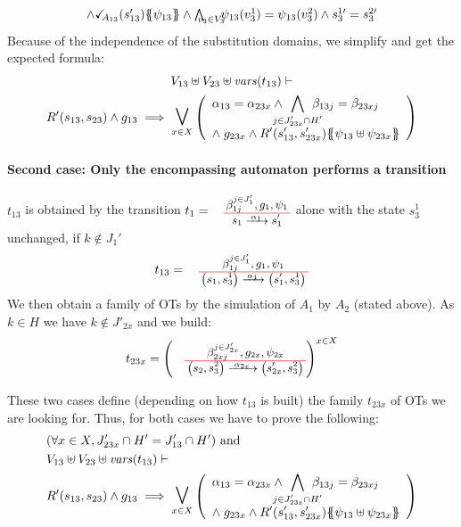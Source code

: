 \documentclass[runningheads]{llncs}
\begin{document}
\begin{enumerate}
\begin{multline*}
{\begin{array}{l}
		  \wedge \reach{A_{13}}\mpar{s_{13}'}\psubst{\psi_{13}} 
\wedge \bigwedge_\subbox{v_3\in V_3}  \psi_{13}(v^1_3)=\psi_{13}(v^2_3)\wedge s^{1\prime}_3=s^{2\prime}_3
		\end{array}}   
\end{multline*}	
Because of the independence of the substitution domains, we simplify and get the expected formula:
	\begin{multline*}
  V_{13} \uplus V_{23} \uplus \fvars{t_{13}} \vdash\\ R^{\prime}\mpar{s_{13}, s_{23}} \wedge g_{13} \implies \operatorname*{\bigsymb{\bigvee}}_{x \in X} \mpar{\everymath{\displaystyle}\begin{array}{l}
			\alpha_{13} = \alpha_{23x} \wedge \bigwedge_\subbox{j \in J'_{23x} \cap H'} \beta_{13j} = \beta_{23xj} \\[12pt]
			\nwedge g_{23x} \wedge R^{\prime}\mpar{s'_{13}, s'_{23x}}\psubst{\psi_{13} \uplus \psi_{23x}}
		\end{array}} 
	\end{multline*}
	
\smallskip

\paragraph{Second case: Only the encompassing automaton performs a transition}
 $t_{13}$ is obtained  by  the transition $t_1=\OTx{1}{}{1}{1}$ alone with the state $s^1_3$ unchanged, if $k \not\in J_1'$
\[t_{13} = \OT{\mpar{s_1, s^1_3}}{\mpar{s'_1, s^1_3}}{\alpha_1}{\beta_{1j}^{j \in J'_1}}{g_1}{\psi_1}
\]
We then obtain a family of OTs by the simulation of $A_1$ by $A_2$ (stated above).
As  $k \in H$ we have $k \not\in J'_{2x}$ and we build:
\[t_{23x} = \left(
\OT{\mpar{s_2, s^2_3}}{\mpar{s'_{2x}, s^2_3}}{\alpha_{2x}}{\beta_{2xj}^{j \in J'_{2x}}}{g_{2x}}{\psi_{2x}} \right)^{x\in X}\]


These two cases define (depending on how $t_{13}$ is built) the family $t_{23x}$ of OTs we are looking for.
Thus, for both cases we have to prove the following:
\begin{align*}		
		&\mpar{\forall x \in X, J'_{23x} \cap H' =
 J'_{13} \cap H'} \text{ and }\\
		&  V_{13} \uplus V_{23} \uplus \fvars{t_{13}} \vdash\\ & R'\mpar{s_{13}, s_{23}} \wedge g_{13} \implies \operatorname*{\bigsymb{\bigvee}}_{x \in X} \mpar{\everymath{\displaystyle}\begin{array}{l}
			\alpha_{13} = \alpha_{23x} \wedge \bigwedge_\subbox{j \in J'_{23x} \cap H'} \beta_{13j} = \beta_{23xj} \\[12pt]
			\nwedge g_{23x} \wedge R'\mpar{s'_{13}, s'_{23x}}\psubst{\psi_{13} \uplus \psi_{23x}}
		\end{array}} 
	\end{align*}
	

\end{enumerate}
\end{document}
